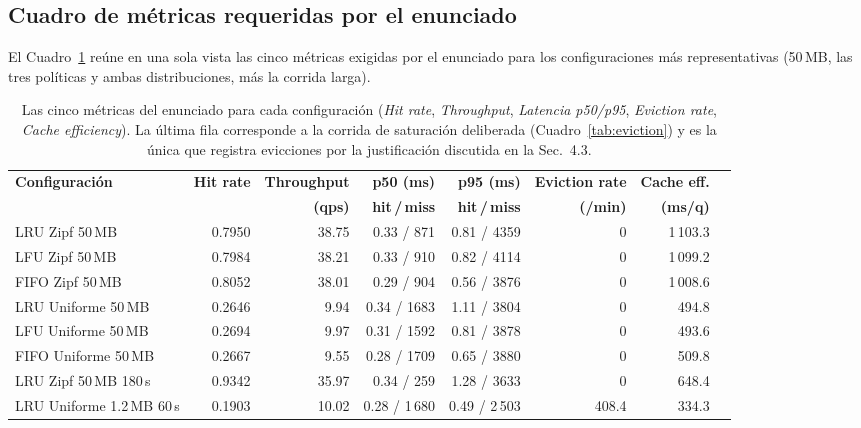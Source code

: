 \documentclass[11pt,a4paper]{article}
\begin{document}
\subsection{Cuadro de métricas requeridas por el enunciado}

El Cuadro~\ref{tab:metrics} reúne en una sola vista las cinco métricas
exigidas por el enunciado para los configuraciones más representativas
(50\,MB, las tres políticas y ambas distribuciones, más la corrida larga).

\begin{table}[h]
\centering\scriptsize
\setlength{\tabcolsep}{4pt}
\begin{tabular}{lrrrrrrr}
\toprule
\textbf{Configuración} & \textbf{Hit rate} & \textbf{Throughput} &
\textbf{p50 (ms)} & \textbf{p95 (ms)} &
\textbf{Eviction rate} & \textbf{Cache eff.} \\
& & \textbf{(qps)} & \textbf{hit\,/\,miss} & \textbf{hit\,/\,miss} &
\textbf{(/min)} & \textbf{(ms/q)} \\
\midrule
LRU  Zipf    50\,MB     & 0.7950 & 38.75 & 0.33 / 871   & 0.81 / 4359  & 0 & 1\,103.3 \\
LFU  Zipf    50\,MB     & 0.7984 & 38.21 & 0.33 / 910   & 0.82 / 4114  & 0 & 1\,099.2 \\
FIFO Zipf    50\,MB     & 0.8052 & 38.01 & 0.29 / 904   & 0.56 / 3876  & 0 & 1\,008.6 \\
LRU  Uniforme 50\,MB    & 0.2646 &  9.94 & 0.34 / 1683  & 1.11 / 3804  & 0 & \phantom{1\,}494.8 \\
LFU  Uniforme 50\,MB    & 0.2694 &  9.97 & 0.31 / 1592  & 0.81 / 3878  & 0 & \phantom{1\,}493.6 \\
FIFO Uniforme 50\,MB    & 0.2667 &  9.55 & 0.28 / 1709  & 0.65 / 3880  & 0 & \phantom{1\,}509.8 \\
LRU  Zipf 50\,MB 180\,s    & 0.9342 & 35.97 & 0.34 / 259   & 1.28 / 3633  &   0   & \phantom{1\,}648.4 \\
LRU  Uniforme 1.2\,MB 60\,s & 0.1903 & 10.02 & 0.28 / 1\,680 & 0.49 / 2\,503 & 408.4 & \phantom{1\,}334.3 \\
\bottomrule
\end{tabular}
\caption{Las cinco métricas del enunciado para cada configuración
(\textit{Hit rate}, \textit{Throughput}, \textit{Latencia p50/p95},
\textit{Eviction rate}, \textit{Cache efficiency}). La última fila
corresponde a la corrida de saturación deliberada (Cuadro~\ref{tab:eviction})
y es la única que registra evicciones por la justificación discutida en
la Sec.~4.3.}\label{tab:metrics}
\end{table}
\end{document}
